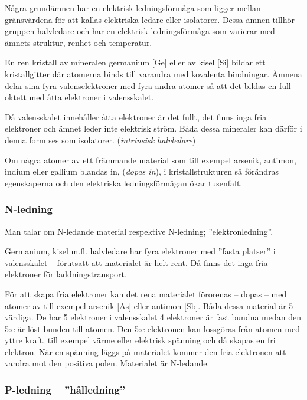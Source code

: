 Några grundämnen har en elektrisk ledningsförmåga som ligger mellan gränsvärdena
för att kallas elektriska ledare eller isolatorer.
Dessa ämnen tillhör gruppen halvledare och har en elektrisk ledningsförmåga som
varierar med ämnets struktur, renhet och temperatur.

En ren kristall av mineralen germanium [Ge] eller av kisel [Si] bildar ett
kristallgitter där atomerna binds till varandra med kovalenta bindningar.
Ämnena delar sina fyra valenselektroner med fyra andra atomer så att det
bildas en full oktett med åtta elektroner i valensskalet.

Då valensskalet innehåller åtta elektroner är det fullt, det finns inga fria
elektroner och ämnet leder inte elektrisk ström.
Båda dessa mineraler kan därför i denna form ses som isolatorer.
(\emph{intrinsisk halvledare})

Om några atomer av ett främmande material som till exempel arsenik, antimon,
indium eller gallium blandas in, (\emph{dopas in}), i kristallstrukturen så
förändras egenskaperna och den elektriska ledningsförmågan ökar tusenfalt.

\subsubsection{N-ledning}

Man talar om N-ledande material respektive N-led\-ni\-ng; ''elektronled\-ni\-ng''.

Germanium, kisel m.fl. halvledare har fyra elektroner med ''fasta platser'' i
valensskalet -- förutsatt att materialet är helt rent.
Då finns det inga fria elektroner för laddningstransport.

För att skapa fria elektroner kan det rena materialet förorenas -- dopas -- med
atomer av till exempel arsenik [As] eller antimon [Sb].
Båda dessa material är 5-värdiga.
De har 5 elektroner i valensskalet 4 elektroner är fast bundna medan
den 5:e är löst bunden till atomen.
Den 5:e elektronen kan lossgöras från atomen med yttre kraft, till exempel värme
eller elektrisk spänning och då skapas en fri elektron.
När en spänning läggs på materialet kommer den fria elektronen att vandra mot
den positiva polen.
Materialet är N-ledande.

\subsubsection{P-ledning -- ''hålledning''}

